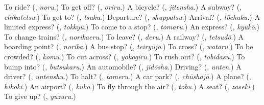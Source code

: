 \begin{tcolorbox}[breakable,colback=teal!4,colframe=teal!35!black,title={Before you move on}]
To ride? (\textbf{}, \emph{noru}.) To get off? (\textbf{}, \emph{oriru}.) A bicycle? (\textbf{}, \emph{jitensha}.) A subway? (\textbf{}, \emph{chikatetsu}.) To get to? (\textbf{}, \emph{tsuku}.) Departure? (\textbf{}, \emph{shuppatsu}.) Arrival? (\textbf{}, \emph{tōchaku}.) A limited express? (\textbf{}, \emph{tokkyū}.) To come to a stop? (\textbf{}, \emph{tomaru}.) An express? (\textbf{}, \emph{kyūkō}.) To change trains? (\textbf{}, \emph{norikaeru}.) To leave? (\textbf{}, \emph{deru}.) A railway? (\textbf{}, \emph{tetsudō}.) A boarding point? (\textbf{}, \emph{noriba}.) A bus stop? (\textbf{}, \emph{teiryūjo}.) To cross? (\textbf{}, \emph{wataru}.) To be crowded? (\textbf{}, \emph{komu}.) To cut across? (\textbf{}, \emph{yokogiru}.) To rush out? (\textbf{}, \emph{tobidasu}.) To bump into? (\textbf{}, \emph{butsukaru}.) An automobile? (\textbf{}, \emph{jidōsha}.) Driving? (\textbf{}, \emph{unten}.) A driver? (\textbf{}, \emph{untenshu}.) To halt? (\textbf{}, \emph{tomeru}.) A car park? (\textbf{}, \emph{chūshajō}.) A plane? (\textbf{}, \emph{hikōki}.) An airport? (\textbf{}, \emph{kūkō}.) To fly through the air? (\textbf{}, \emph{tobu}.) A seat? (\textbf{}, \emph{zaseki}.) To give up? (\textbf{}, \emph{yuzuru}.)
\end{tcolorbox}
